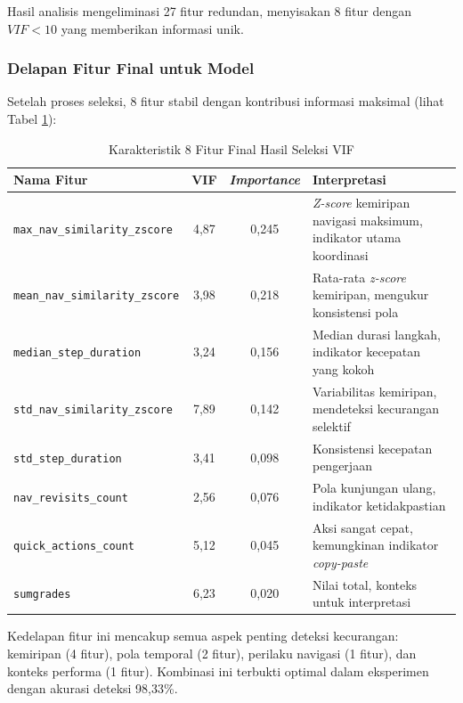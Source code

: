 Hasil analisis mengeliminasi 27 fitur redundan, menyisakan 8 fitur dengan $VIF < 10$ yang memberikan informasi unik.

\subsubsection{Delapan Fitur Final untuk Model}
\label{sec:fiturFinal}

Setelah proses seleksi, 8 fitur stabil dengan kontribusi informasi maksimal (lihat Tabel \ref{tabel:fiturFinalKarakteristik}):

\begin{table}[htbp]
\centering
\caption{Karakteristik 8 Fitur Final Hasil Seleksi VIF}
\label{tabel:fiturFinalKarakteristik}
\begin{tabular}{|p{7cm}|c|c|p{5cm}|}
\hline
\textbf{Nama Fitur} & \textbf{VIF} & \textbf{\textit{Importance}} & \textbf{Interpretasi} \\
\hline
\texttt{max\_nav\_similarity\_zscore} & 4,87 & 0,245 & \textit{Z-score} kemiripan navigasi maksimum, indikator utama koordinasi \\
\hline
\texttt{mean\_nav\_similarity\_zscore} & 3,98 & 0,218 & Rata-rata \textit{z-score} kemiripan, mengukur konsistensi pola \\
\hline
\texttt{median\_step\_duration} & 3,24 & 0,156 & Median durasi langkah, indikator kecepatan yang kokoh \\
\hline
\texttt{std\_nav\_similarity\_zscore} & 7,89 & 0,142 & Variabilitas kemiripan, mendeteksi kecurangan selektif \\
\hline
\texttt{std\_step\_duration} & 3,41 & 0,098 & Konsistensi kecepatan pengerjaan \\
\hline
\texttt{nav\_revisits\_count} & 2,56 & 0,076 & Pola kunjungan ulang, indikator ketidakpastian \\
\hline
\texttt{quick\_actions\_count} & 5,12 & 0,045 & Aksi sangat cepat, kemungkinan indikator \textit{copy-paste} \\
\hline
\texttt{sumgrades} & 6,23 & 0,020 & Nilai total, konteks untuk interpretasi \\
\hline
\end{tabular}
\end{table}

Kedelapan fitur ini mencakup semua aspek penting deteksi kecurangan: kemiripan (4 fitur), pola temporal (2 fitur), perilaku navigasi (1 fitur), dan konteks performa (1 fitur). Kombinasi ini terbukti optimal dalam eksperimen dengan akurasi deteksi 98,33\%.